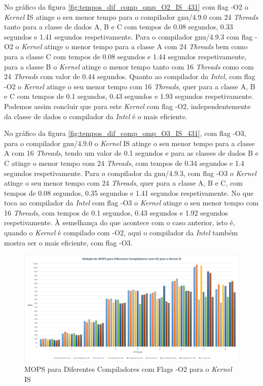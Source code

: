\documentclass[conference,compsoc]{IEEEtran}
\begin{document}
No gráfico da figura \ref{fig:tempos_dif_comp_omp_O2_IS_431} com flag -O2 o \textit{Kernel} IS atinge o seu menor tempo para o compilador gnu/4.9.0 com 24 \textit{Threads} tanto para a classe de dados A, B e C com tempos de 0.08 segundos, 0.33 segundos e 1.41 segundos respetivamente. Para o compilador gnu/4.9.3 com flag -O2 o \textit{Kernel} atinge o menor tempo para a classe A com 24 \textit{Threads} bem como para a classe C com tempos de 0.08 segundos e 1.44 segundos respetivamente, para a classe B o \textit{Kernel} atinge o menor tempo tanto com 16 \textit{Threads} como com 24 \textit{Threads} com valor de 0.44 segundos. Quanto ao compilador da \textit{Intel}, com flag -O2 o \textit{Kernel} atinge o seu menor tempo com 16 \textit{Threads}, quer para a classe A, B e C com tempos de 0.1 segundos, 0.43 segundos e 1.93 segundos respetivamente. Podemos assim concluir que para este \textit{Kernel} com flag -O2, independentemente da classe de dados o compilador da \textit{Intel} é o mais eficiente.

No gráfico da figura \ref{fig:tempos_dif_comp_omp_O3_IS_431}, com flag -O3, para o compilador gnu/4.9.0 o \textit{Kernel} IS atinge o seu menor tempo para a classe A com 16 \textit{Threads}, tendo um valor de 0.1 segundos e para as classes de dados B e C atinge o menor tempo com 24 \textit{Threads}, com tempos de 0.34 segundos e 1.4 segundos respetivamente. Para o compilador da gnu/4.9.3, com flag -O3 o \textit{Kernel} atinge o seu menor tempo com 24 \textit{Threads}, quer para a classe A, B e C, com tempos de 0.08 segundos, 0.35 segundos e 1.41 segundos respetivamente. No que toca ao compilador da \textit{Intel} com flag -O3 o \textit{Kernel} atinge o seu menor tempo com 16 \textit{Threads}, com tempos de 0.1 segundos, 0.43 segundos e 1.92 segundos respetivamente. À semelhança do que acontece com o caso anterior, isto é, quando o \textit{Kernel} é compilado com -O2, aqui o compilador da \textit{Intel} também mostra ser o mais eficiente, com flag -O3.

\begin{figure}[h!]
\centering
\includegraphics[scale=0.225]{OMP/mops_dif_comp-O2_IS_nodo-431.png}
\caption{MOPS para Diferentes Compiladores com Flags -O2 para o \textit{Kernel} IS}
\label{fig:mops_dif_comp_omp_O2_IS_431}
\end{figure}
\end{document}
